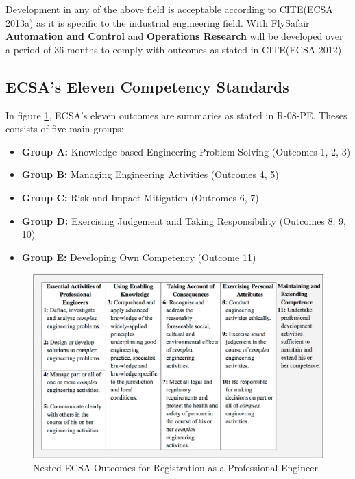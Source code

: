 \documentclass[11pt,a4paper]{article}
\begin{document}
		Development in any of the above field is acceptable according to CITE(ECSA 2013a) as it is specific to the industrial engineering field. With FlySafair \textbf{Automation and Control} and \textbf{Operations Research} will be developed over a period of 36 months to comply with outcomes as stated in CITE(ECSA 2012).
		
	\subsection{ECSA's Eleven Competency Standards}
		In figure \ref{fig: ECSA}, ECSA's eleven outcomes are summaries as stated in R-08-PE. 
		Theses consists of five main groups:
		
		\begin{itemize}
		
		\item[]	\textbf{Group A:} Knowledge-based Engineering Problem Solving (Outcomes 1, 2, 3)
			

		\item[]	\textbf{Group B:} Managing Engineering Activities (Outcomes 4, 5)

		\item[]	\textbf{Group C:} Risk and Impact Mitigation (Outcomes 6, 7)

		\item[]	\textbf{Group D:} Exercising Judgement and Taking Responsibility (Outcomes 8, 9, 10)

		\item[]	\textbf{Group E:} Developing Own Competency (Outcome 11)
				
		\end{itemize}

		\begin{figure}[H]
		\centering
		\includegraphics[width=\textwidth]{Extra/ECSA_Outcomes.png}
		\caption{Nested ECSA Outcomes for Registration as a Professional Engineer}\label{fig: ECSA}
		\end{figure}
		
\end{document}
